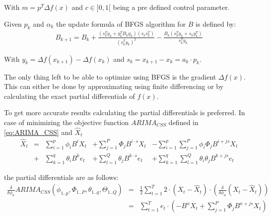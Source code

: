 With $m= p^T \Delta f(x)$ and $c\in]0,1[$ being a pre defined control parameter.

Given $p_k$ and $\alpha_k$ the update formula of \acl{BFGS} algorithm for $B$ is defined by:
\begin{equation}\label{eq:lbfgs_update_1}
	\begin{array}{lc}
		B_{k+1} = B_k + \frac{(s_k^T y_k + y_k^T B_k y_k)(s_k s_k^T)}{(s_k^T y_k)^2} - \frac{B_k (s_k^T y_k + s_k y_k^T)}{s_k^T y_k}
	\end{array}
\end{equation}

With $y_k = \Delta f(x_{k+1}) - \Delta f(x_k)$ and $s_k = x_{k+1}-x_k = a_k \cdot p_k$.

The only thing left to be able to optimize using \acs{BFGS} is the gradient $\Delta f(x)$. This can either be done by approximating using finite differencing or by calculating the exact partial differentials of $f(x)$. 


To get more accurate results calculating the partial differentials is preferred. In case of minimizing the objective function $ARIMA_{CSS}$ defined in \eqref{eq:ARIMA_CSS} and $\hat{X}_t$
\begin{equation}\label{eq:ARIMA_CSS_long}
	\begin{array}{rrlll}
    	\hat{X}_t &=& \displaystyle\sum_{i=1}^{p} \phi_i B^i X_t &+ \displaystyle\sum_{j=1}^{P} \Phi_j B^{i\cdot s} X_t &- \displaystyle\sum_{i=1}^{p}\displaystyle\sum_{j=1}^{P} \phi_i \Phi_j B^{i + js} X_t \\
        &+& \displaystyle\sum_{k=1}^{q} \theta_i B^k e_t &+ \displaystyle\sum_{l=1}^{Q} \theta_j B^{k\cdot s} e_t &+ \displaystyle\sum_{k=1}^{q}\displaystyle\sum_{l=1}^{Q} \theta_i \theta_j B^{k + js} e_t
	\end{array}
\end{equation}

the partial differentials are as follows:
\begin{equation}\label{eq:gradient_arima_phi}
	\begin{array}{lcl}
		\frac{\delta}{\delta \phi_n} ARIMA_{CSS}(\phi_{1..p}, \Phi_{1..P}, \theta_{1..q}, \Theta_{1..Q}) &=& \frac{1}{2}\displaystyle\sum_{t=1}^{T} 2 \cdot (X_t - \hat{X}_t) \cdot (\frac{\delta}{\delta \phi_n} (X_t - \hat{X}_t))\\
        &=& \displaystyle\sum_{t=1}^{T} e_t \cdot  (-B^n X_t +  \displaystyle\sum_{j=1}^{P} \Phi_j B^{n + js} X_t)
	\end{array}
\end{equation}

